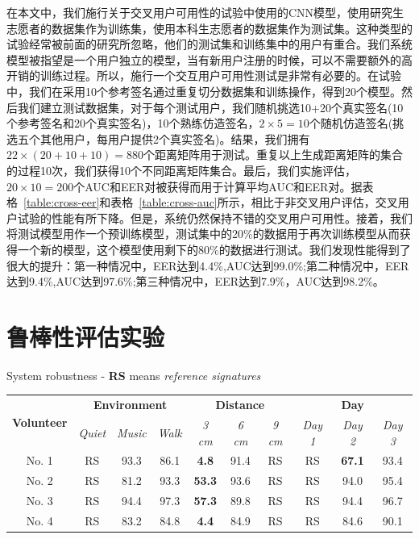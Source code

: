 在本文中，我们施行关于交叉用户可用性的试验中使用的CNN模型，使用研究生志愿者的数据集作为训练集，使用本科生志愿者的数据集作为测试集。这种类型的试验经常被前面的研究所忽略，他们的测试集和训练集中的用户有重合。我们系统模型被指望是一个用户独立的模型，当有新用户注册的时候，可以不需要额外的高开销的训练过程。所以，施行一个交互用户可用性测试是非常有必要的。在试验中，我们在采用10个参考签名通过重复切分数据集和训练操作，得到20个模型。然后我们建立测试数据集，对于每个测试用户，我们随机挑选10+20个真实签名(10个参考签名和20个真实签名)，10个熟练仿造签名，$2\times 5=10$个随机仿造签名(挑选五个其他用户，每用户提供2个真实签名)。结果，我们拥有$22\times (20+10+10)=880$个距离矩阵用于测试。重复以上生成距离矩阵的集合的过程10次，我们获得10个不同距离矩阵集合。最后，我们实施评估，$20\times 10=200$个AUC和EER对被获得而用于计算平均AUC和EER对。据表格~\ref{table:cross-eer}和表格~\ref{table:cross-auc}所示，相比于非交叉用户评估，交叉用户试验的性能有所下降。但是，系统仍然保持不错的交叉用户可用性。接着，我们将测试模型用作一个预训练模型，测试集中的20\%的数据用于再次训练模型从而获得一个新的模型，这个模型使用剩下的80\%的数据进行测试。我们发现性能得到了很大的提升：第一种情况中，EER达到4.4\%,AUC达到99.0\%;第二种情况中，EER达到9.4\%,AUC达到97.6\%;第三种情况中，EER达到7.9\%，AUC达到98.2\%。

\section{鲁棒性评估实验}
\label{sec:robustness-experiment}
\begin{table}[ht]
  \centering
  {System robustness - \textbf{RS} means \textit{reference signatures}}
  \label{table:system-robustness}
  \begin{tabular}{|c|ccc|ccc|ccc|}
    \hline
    \multirow{2}{*}{\textbf{Volunteer}} & \multicolumn{3}{|c|}{\textbf{Environment}} & \multicolumn{3}{|c|}{\textbf{Distance}} & \multicolumn{3}{|c|}{\textbf{Day}} \\
    \cline{2-10}
     & \textit{Quiet} & \textit{Music} & \textit{Walk} & \textit{3 cm} &  \textit{6 cm} & \textit{9 cm} & \textit{Day 1} & \textit{Day 2} & \textit{Day 3}\\
    \hline
    No. 1 & RS   & 93.3 & 86.1  & \textbf{4.8} & 91.4 & RS &  RS & \textbf{67.1} & 93.4  \\  
    \hline
    No. 2 & RS & 81.2 & 93.3  & \textbf{53.3} & 93.6 & RS & RS & 94.0 & 95.4 \\
    \hline
    No. 3 & RS & 94.4 & 97.3  & \textbf{57.3} & 89.8 & RS & RS &  94.4 & 96.7 \\
    \hline
    No. 4 & RS & 83.2 & 84.8  & \textbf{4.4} & 84.9 & RS & RS &  84.6 & 90.1 \\
    \hline 
  \end{tabular}
\end{table}

